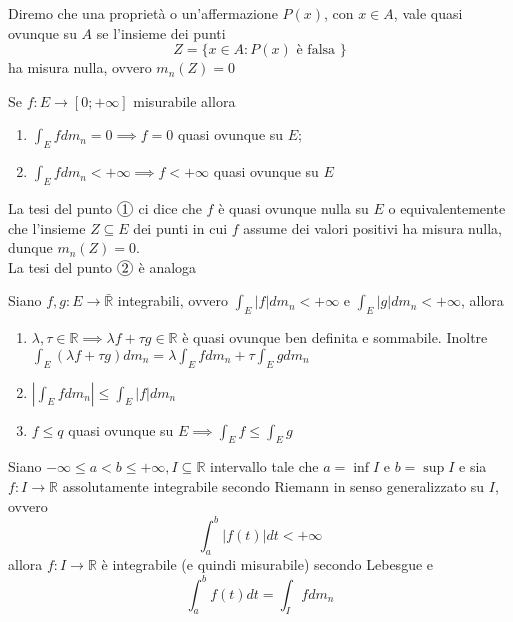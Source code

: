 \begin{definition}
	Diremo che una proprietà o un'affermazione $P(x)$, con $x \in A$, vale quasi ovunque su $A$ se l'insieme dei punti
	$$
		Z = \{x \in A: P(x) \text{ è falsa } \}
	$$
	ha misura nulla, ovvero $m_n(Z) = 0$
\end{definition}
\begin{prop}
	Se $f: E \to [0; +\infty]$ misurabile allora
	\begin{enumerate}[label=\protect\circled{\arabic*}]
		\item $\int_E fdm_n = 0 \implies f=0$ quasi ovunque su $E$;
		\item $\int_E fdm_n < +\infty \implies f<+\infty$ quasi ovunque su $E$ 
	\end{enumerate}
\end{prop}
\begin{remark}
	La tesi del punto $\circled{1}$ ci dice che $f$ è quasi ovunque nulla su $E$ o equivalentemente che l'insieme $Z \subseteq E$ dei punti in cui $f$ assume dei valori positivi ha misura nulla, dunque $m_n(Z) = 0$. \\
	La tesi del punto $\circled{2}$ è analoga
\end{remark}
\begin{theorem}
	Siano $f, g: E \to \bar{\mathbb{R}}$ integrabili, ovvero $\int_E |f| dm_n < +\infty$ e $\int_E |g|dm_n < + \infty$, allora
	\begin{enumerate}[label=\protect\circled{\arabic*}]
		\item $\lambda, \tau \in \mathbb{R} \implies \lambda f + \tau g \in \mathbb{R}$ è quasi ovunque ben definita e sommabile. Inoltre
		$\int_E (\lambda f + \tau g) dm_n = \lambda \int_E f dm_n + \tau \int_E g dm_n$
		\item $|\int_E f dm_n| \leq \int_E |f|dm_n$
		\item $f \leq q$ quasi ovunque su $E \implies \int_E f \leq \int_E g$ 
	\end{enumerate}
\end{theorem}
\begin{theorem}
	Siano $-\infty \leq a < b \leq +\infty, I \subseteq \mathbb{R}$ intervallo tale che $a = \inf{I}$ e $b=\sup{I}$ e sia $f: I \to \mathbb{R}$ assolutamente integrabile secondo Riemann in senso generalizzato su $I$, ovvero
	$$
	\int_a^b |f(t)|dt < +\infty
	$$
	allora $f: I \to \mathbb{R}$ è integrabile (e quindi misurabile) secondo Lebesgue e
	\begin{equation}
		\int_a^b f(t)dt = \int_I fdm_n
		\label{eq:eqv_leb_riem}
	\end{equation}
\end{theorem}
